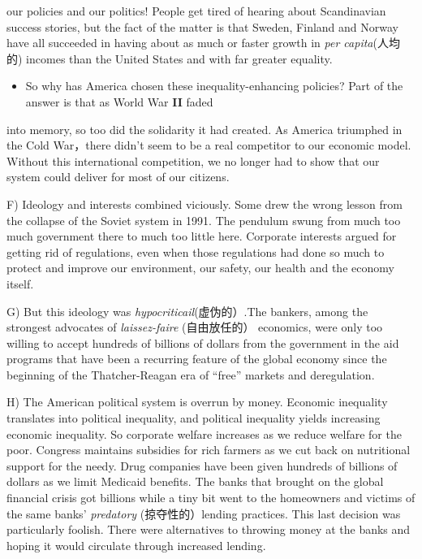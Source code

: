 \documentclass[UTF8,11pt]{ctexart}
\begin{document}
our policies and our politics! People get tired of hearing about Scandinavian success stories, but the fact of the matter is that Sweden, Finland and Norway have all succeeded in having about as much or faster growth in\textit{ per capita}(人均的) incomes than the United States and with far greater equality.


\begin{itemize}[leftmargin=2em,itemsep=.2em,topsep=.4em]\item[E.] So why has America chosen these inequality-enhancing policies? Part of the answer is that as World War\textbf{ II} faded
\end{itemize}

into memory, so too did the solidarity it had created. As America triumphed in the Cold War，there didn’t seem to be a real competitor to our economic model. Without this international competition, we no longer had to show that our system could deliver for most of our citizens.


F) Ideology and interests combined viciously. Some drew the wrong lesson from the collapse of the Soviet system in 1991. The pendulum swung from much too much government there to much too little here. Corporate interests argued for getting rid of regulations, even when those regulations had done so much to protect and improve our environment, our safety, our health and the economy itself.


G) But this ideology was\textit{ hypocriticail}(虚伪的）.The bankers, among the strongest advocates of\textit{ laissez-faire} (自由放任的） economics, were only too willing to accept hundreds of billions of dollars from the government in the aid programs that have been a recurring feature of the global economy since the beginning of the Thatcher-Reagan era of “free” markets and deregulation.


H) The American political system is overrun by money. Economic inequality translates into political inequality, and political inequality yields increasing economic inequality. So corporate welfare increases as we reduce welfare for the poor. Congress maintains subsidies for rich farmers as we cut back on nutritional support for the needy. Drug companies have been given hundreds of billions of dollars as we limit Medicaid benefits. The banks that brought on the global financial crisis got billions while a tiny bit went to the homeowners and victims of the same banks’\textit{ predatory} (掠夺性的）lending practices. This last decision was particularly foolish. There were alternatives to throwing money at the banks and hoping it would circulate through increased lending.
\end{document}
